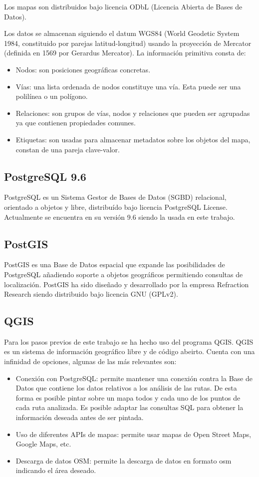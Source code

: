 Los mapas son distribuidos bajo licencia ODbL (Licencia Abierta de Bases de Datos).

Los datos se almacenan siguiendo el datum WGS84 (World Geodetic System 1984, constituido por parejas latitud-longitud) usando la proyección de Mercator (definida en 1569  por Gerardus Mercator). La información primitiva consta de:

\begin{itemize}
	\item Nodos: son posiciones geográficas concretas.
	\item Vías: una lista ordenada de nodos constituye una vía. Esta puede ser una polilínea o un polígono.
	\item Relaciones: son grupos de vías, nodos y relaciones que pueden ser agrupadas ya que contienen propiedades comunes.
	\item Etiquetas: son usadas para almacenar metadatos sobre los objetos del mapa, constan de una pareja clave-valor. 
\end{itemize}

\subsection{PostgreSQL 9.6}
PostgreSQL es un Sistema Gestor de Bases de Datos (SGBD) relacional, orientado a objetos y libre, distribuído bajo licencia PostgreSQL License. Actualmente se encuentra en su versión 9.6 siendo la usada en este trabajo.

\subsection{PostGIS}
PostGIS es una Base de Datos espacial que expande las posibilidades de PostgreSQL añadiendo soporte a objetos geográficos permitiendo consultas de localización. PostGIS ha sido diseñado y desarrollado por la empresa Refraction Research siendo distribuido bajo licencia GNU (GPLv2).

\subsection{QGIS}
Para los pasos previos de este trabajo se ha hecho uso del programa QGIS. QGIS es un sistema de información geográfico libre y de código abeirto. Cuenta con una infinidad de opciones, algunas de las más relevantes son:

\begin{itemize}
	\item Conexión con PostgreSQL: permite mantener una conexión contra la Base de Datos que contiene los datos relativos a los análisis de las rutas. De esta forma es posible pintar sobre un mapa todos y cada uno de los puntos de cada ruta analizada. Es posible adaptar las consultas SQL para obtener la información deseada antes de ser pintada.
	\item Uso de diferentes APIs de mapas: permite usar mapas de Open Street Maps, Google Maps, etc.
	\item Descarga de datos OSM: permite la descarga de datos en formato osm indicando el área deseado.
\end{itemize}

